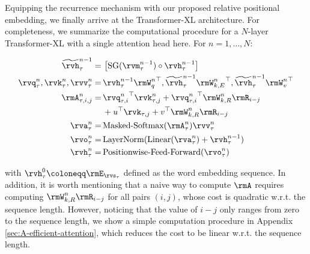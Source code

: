 Equipping the recurrence mechanism with our proposed relative positional embedding, we finally arrive at the Transformer-XL architecture.
For completeness, we summarize the computational procedure for a $N$-layer Transformer-XL with a single attention head here. For $n = 1, \dots, N$:
\par\nobreak
\vspace{-0.5em}
\small
\begingroup
\allowdisplaybreaks
\begin{align*}
\widetilde{\rvh}_{\tau}^{n-1}
	=&\, \left[ \text{SG}(\rvm_{\tau}^{n-1}) \circ \rvh_{\tau}^{n-1} \right] \\
\rvq_{\tau}^{n}, \rvk_{\tau}^{n}, \rvv_{\tau}^{n}
	=&\, \rvh_{\tau}^{n-1} {\rmW_q^{n}}^\top, \widetilde{\rvh}_{\tau}^{n-1} {\rmW_{k,E}^{n}}^\top, \widetilde{\rvh}_{\tau}^{n-1} {\rmW_v^{n}}^\top \\
\rmA_{\tau,i,j}^{n}
	=&\, {\rvq_{\tau,i}^{n}}^\top \rvk_{\tau,j}^{n} + {\rvq_{\tau,i}^{n}}^\top \rmW_{k,R}^{n} \rmR_{i-j} \\&\,+ u^\top \rvk_{\tau,j} + v^\top \rmW_{k,R}^{n} \rmR_{i-j} \\
\rva_{\tau}^{n} =&\, \text{Masked-Softmax}(\rmA_{\tau}^{n}) \rvv_{\tau}^{n} \\
\rvo_{\tau}^{n} =&\, \text{LayerNorm}(\text{Linear}(\rva_{\tau}^{n}) + \rvh_{\tau}^{n-1}) \\
\rvh_{\tau}^{n} =&\, \text{Positionwise-Feed-Forward}(\rvo_{\tau}^{n})
\end{align*}
\endgroup
\normalsize
\vspace{-1.5em}

\noindent with $\rvh_{\tau}^{0} \coloneqq \rmE_{\rvs_{\tau}}$ defined as the word embedding sequence.
In addition, it is worth mentioning that a naive way to compute $\rmA$ requires computing $\rmW_{k,R}^{n} \rmR_{i-j}$ for all pairs $(i,j)$, whose cost is quadratic w.r.t. the sequence length.
However, noticing that the value of $i-j$ only ranges from zero to the sequence length,
we show a simple computation procedure in Appendix \ref{sec:A-efficient-attention}, which reduces the cost to be linear w.r.t. the sequence length.

